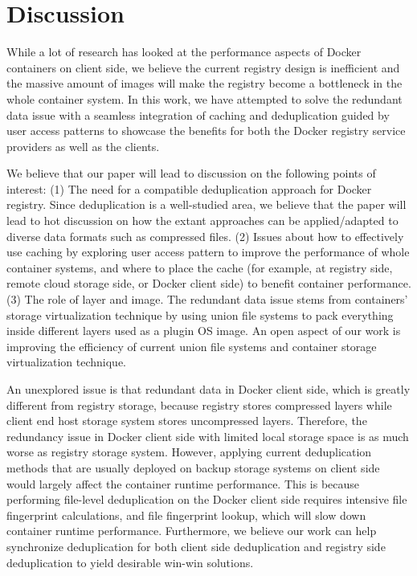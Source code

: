 
\newpage
\section{Discussion}
\label{sec:discussion}
While a lot of research has looked at the performance aspects of Docker containers on client side,
we believe the current registry design is inefficient and 
the massive amount of images will make the registry become a bottleneck in the whole
container system.
In this work, we have attempted to solve the redundant data issue 
with a seamless integration of caching and deduplication guided by user access patterns
to showcase the benefits for both the Docker registry service providers as well as the clients.

We believe that our paper will lead to discussion on the following points of interest:
(1) The need for a compatible deduplication approach for Docker registry.
Since deduplication is a well-studied area, we believe that the paper will lead to 
hot discussion on how the extant approaches can be applied/adapted
to diverse data formats such as compressed files.
(2) Issues about how to effectively use caching by exploring user access pattern to improve the performance of whole container systems,
and where to place the cache (for example, at registry side, remote cloud storage side, or Docker client side)
to benefit container performance. 
(3) The role of layer and image.
The redundant data issue stems from containers' storage virtualization technique by using
union file systems to pack everything inside different layers used as a plugin OS image.
An open aspect of our work is improving 
the efficiency of current union file systems and container storage virtualization technique.

An unexplored issue is that redundant data in Docker client side, which is
greatly different from registry storage, 
because registry stores compressed layers
while client end host storage system stores uncompressed layers.
Therefore, the redundancy issue in Docker client side with limited local storage space is
 as much worse as registry storage system.
 However, applying current deduplication methods that are usually deployed on backup storage systems
  on
 client side would largely affect the container runtime performance. 
 This is because performing file-level deduplication on the Docker client side
 requires intensive file fingerprint calculations, and file fingerprint lookup, 
 which will slow down container runtime performance.
 Furthermore, we believe our work can help  synchronize deduplication for both
 client side deduplication and registry side deduplication
 to yield desirable win-win solutions.
 
